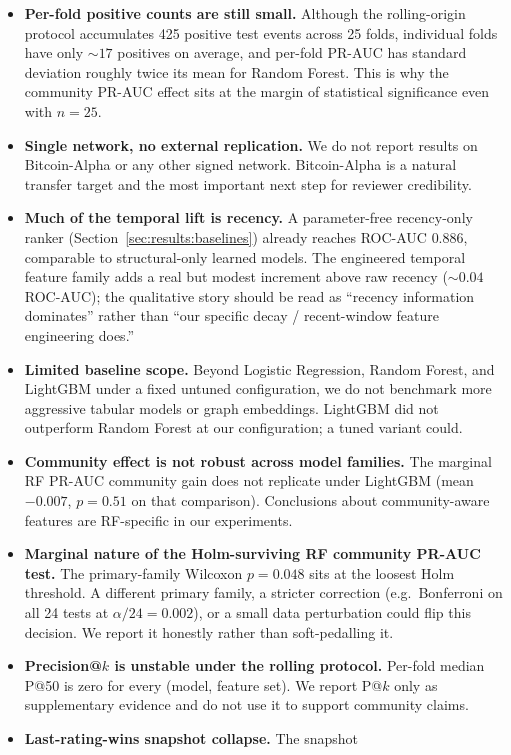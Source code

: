 \documentclass[conference]{IEEEtran}
\begin{document}
\begin{itemize}
\item \textbf{Per-fold positive counts are still small.} Although
the rolling-origin protocol accumulates 425 positive test events
across 25 folds, individual folds have only $\sim 17$ positives on
average, and per-fold PR-AUC has standard deviation roughly twice its
mean for Random Forest. This is why the community PR-AUC effect sits
at the margin of statistical significance even with $n = 25$.
\item \textbf{Single network, no external replication.} We do not
report results on Bitcoin-Alpha or any other signed network.
Bitcoin-Alpha is a natural transfer target and the most important
next step for reviewer credibility.
\item \textbf{Much of the temporal lift is recency.} A parameter-free
recency-only ranker (Section~\ref{sec:results:baselines}) already
reaches ROC-AUC $0.886$, comparable to structural-only learned models.
The engineered temporal feature family adds a real but modest
increment above raw recency ($\sim 0.04$ ROC-AUC); the qualitative
story should be read as ``recency information dominates'' rather than
``our specific decay / recent-window feature engineering does.''
\item \textbf{Limited baseline scope.} Beyond Logistic Regression,
Random Forest, and LightGBM under a fixed untuned configuration, we
do not benchmark more aggressive tabular models or graph embeddings.
LightGBM did not outperform Random Forest at our configuration; a
tuned variant could.
\item \textbf{Community effect is not robust across model families.}
The marginal RF PR-AUC community gain does not replicate under
LightGBM (mean $-0.007$, $p = 0.51$ on that comparison). Conclusions
about community-aware features are RF-specific in our experiments.
\item \textbf{Marginal nature of the Holm-surviving RF community
PR-AUC test.} The primary-family Wilcoxon $p = 0.048$ sits at the
loosest Holm threshold. A different primary family, a stricter
correction (e.g.\ Bonferroni on all 24 tests at
$\alpha / 24 = 0.002$), or a small data perturbation could flip this
decision. We report it honestly rather than soft-pedalling it.
\item \textbf{Precision@$k$ is unstable under the rolling protocol.}
Per-fold median P@50 is zero for every (model, feature set). We
report P@$k$ only as supplementary evidence and do not use it to
support community claims.
\item \textbf{Last-rating-wins snapshot collapse.} The snapshot

\end{itemize}
\end{document}
